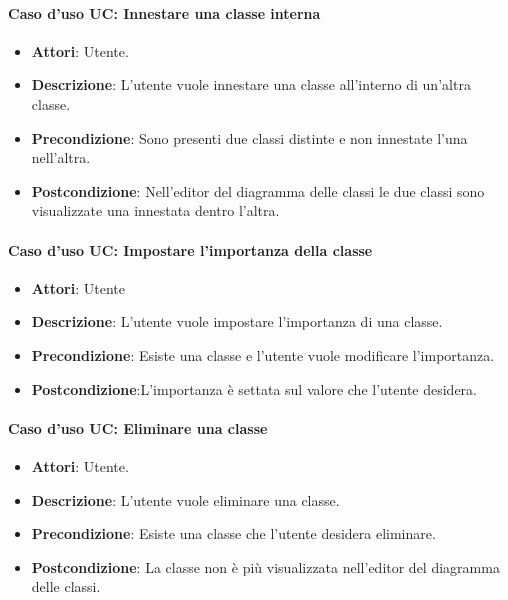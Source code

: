 
\paragraph{Caso d'uso UC: Innestare una classe interna}
\begin{itemize}
	\item\textbf{Attori}: Utente.
	\item\textbf{Descrizione}: L'utente vuole innestare una classe all'interno di un'altra classe.
	\item\textbf{Precondizione}: Sono presenti due classi distinte e non innestate l'una nell'altra.
	\item\textbf{Postcondizione}: Nell'editor del diagramma delle classi le due classi sono visualizzate una innestata dentro l'altra.	
\end{itemize}

\paragraph{Caso d'uso UC: Impostare l'importanza della classe}
\begin{itemize}
	\item\textbf{Attori}: Utente
	\item\textbf{Descrizione}: L'utente vuole impostare l'importanza di una classe.
	\item\textbf{Precondizione}: Esiste una classe e l'utente vuole modificare l'importanza.
	\item\textbf{Postcondizione}:L'importanza è settata sul valore che l'utente desidera.
\end{itemize}

\paragraph{Caso d'uso UC: Eliminare una classe}
\begin{itemize}
	\item\textbf{Attori}: Utente.
	\item\textbf{Descrizione}: L'utente vuole eliminare una classe.
	\item\textbf{Precondizione}: Esiste una classe che l'utente desidera eliminare.
	\item\textbf{Postcondizione}: La classe non è più visualizzata nell'editor del diagramma delle classi.
\end{itemize}

